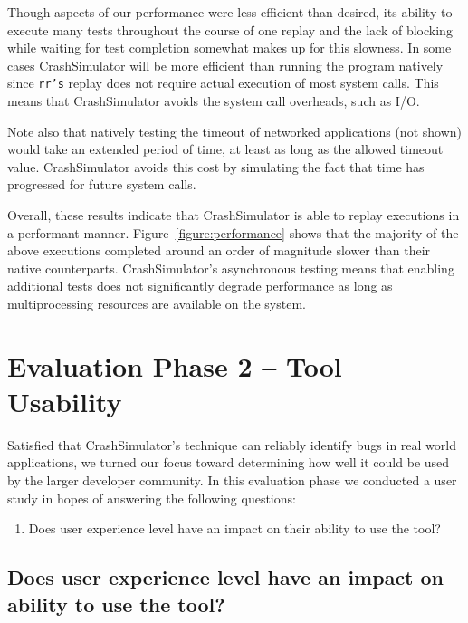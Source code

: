 Though aspects of our performance were less efficient than desired, its
ability to execute many tests throughout the course of one replay and the
lack of blocking while waiting for test completion somewhat makes up for
this slowness. In some cases CrashSimulator will be more efficient than
running the program natively since {\tt rr's} replay does not require
actual execution of most system calls.  This means that CrashSimulator
avoids the system call overheads, such as I/O.

Note also that natively testing the timeout of networked applications (not
shown) would take an extended period of time, at least as long as the
allowed timeout value.  CrashSimulator avoids this cost by simulating the
fact that time has progressed for future system calls.

Overall, these results indicate that CrashSimulator is able to replay
executions in a performant manner.  Figure~\ref{figure:performance} shows
that the majority of the above executions completed around an order of
magnitude slower than their native counterparts.  CrashSimulator's
asynchronous testing means that enabling additional tests does not
significantly degrade performance as long as multiprocessing resources are
available on the system.


\section{Evaluation Phase 2 -- Tool Usability}

Satisfied that CrashSimulator's technique can reliably identify bugs in
real world applications, we turned our focus toward determining how well it
could be used by the larger developer community.  In this evaluation phase
we conducted a user study in hopes of answering the following questions:

\begin{enumerate}


\item Does user experience level have an impact on their ability to use the
tool?


\end{enumerate}

\subsection{Does user experience level have an impact on ability to use the
tool?}

